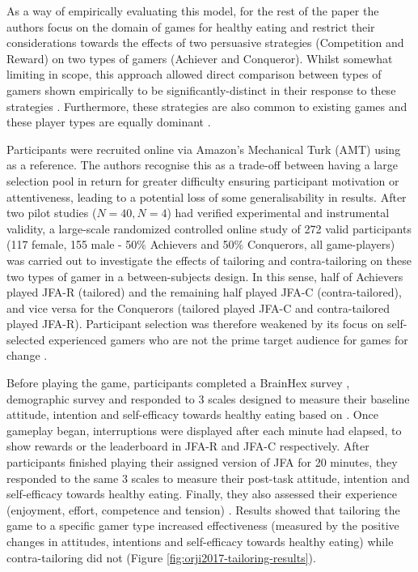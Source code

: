\documentclass[11pt]{article}
\begin{document}
As a way of empirically evaluating this model, for the rest of the paper the authors focus on the domain of games for healthy eating and restrict their considerations towards the effects of two persuasive strategies (Competition and Reward) on two types of gamers (Achiever and Conqueror). Whilst somewhat limiting in scope, this approach allowed direct comparison between types of gamers shown empirically to be significantly-distinct in their response to these strategies \citep{orji2013a}. Furthermore, these strategies are also common to existing games \citep{bell2006} and these player types are equally dominant \citep{bartle1996}. 

Participants were recruited online via Amazon’s Mechanical Turk (AMT) using \citet{mason2012} as a reference. The authors recognise this as a trade-off between having a large selection pool in return for greater difficulty ensuring participant motivation or attentiveness, leading to a potential loss of some generalisability in results. After two pilot studies ($N=40, N=4$) had verified experimental and instrumental validity, a large-scale randomized controlled online study of 272 valid participants (117 female, 155 male - 50\% Achievers and 50\% Conquerors, all game-players) was carried out to investigate the effects of tailoring and contra-tailoring on these two types of gamer in a between-subjects design. In this sense, half of Achievers played JFA-R (tailored) and the remaining half played JFA-C (contra-tailored), and vice versa for the Conquerors (tailored played JFA-C and contra-tailored played JFA-R). Participant selection was therefore weakened by its focus on self-selected experienced gamers who are not the prime target audience for games for change \citep{brox2011}.

Before playing the game, participants completed a BrainHex survey \citep{nacke2014}, demographic survey and responded to 3 scales designed to measure their baseline attitude, intention and self-efficacy towards healthy eating based on \citet{ajzen2002}. Once gameplay began, interruptions were displayed after each minute had elapsed, to show rewards or the leaderboard in JFA-R and JFA-C respectively. After participants finished playing their assigned version of JFA for 20 minutes, they responded to the same 3 scales to measure their post-task attitude, intention and self-efficacy towards healthy eating. Finally, they also assessed their experience (enjoyment, effort, competence and tension) \citep{ryan2006}. Results showed that tailoring the game to a specific gamer type increased effectiveness (measured by the positive changes in attitudes, intentions and self-efficacy towards healthy eating) while contra-tailoring did not (Figure \ref{fig:orji2017-tailoring-results}).
\end{document}
